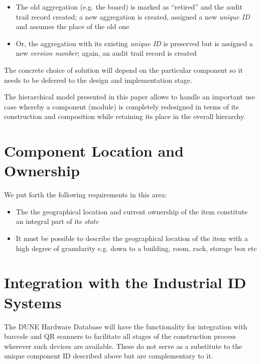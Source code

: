 \documentclass[pdftex,12pt,letter]{article}
\begin{document}
\begin{itemize}

\item The old aggregation (e.g. the board) is marked as ``retired'' and the audit trail record created; a new aggregation is
created, assigned a new \textit{unique ID} and assumes the place of the old one

\item Or, the aggregation with its existing \textit{unique ID} is preserved but is assigned a new \textit{version number};
again, an audit trail record is created

\end{itemize}

\noindent The concrete choice of solution will depend on the particular component so it needs to be deferred to the
design and implementation stage.

The hierarchical model presented in this paper allows to handle an important use case whereby a component (module)
is completely redesigned in terms of its construction and composition while retaining its place in the overall hierarchy.

\section{Component Location and Ownership}

We put forth the following requirements in this area:
\begin{itemize}

\item The  the geographical location and current ownership of the item constitute an integral part of its \textit{state}

\item It must be possible to describe the geographical location of the item with a high degree of granularity e.g. down to a building,
room, rack, storage box etc


\end{itemize}

\section{Integration with the Industrial ID Systems}

The DUNE Hardware Database will have the functionality for integration with barcode and QR scanners to facilitate
all stages of the construction process wherever such devices are available. These do not serve as a substitute to the
unique component ID described above but are complementary to it.
\end{document}
